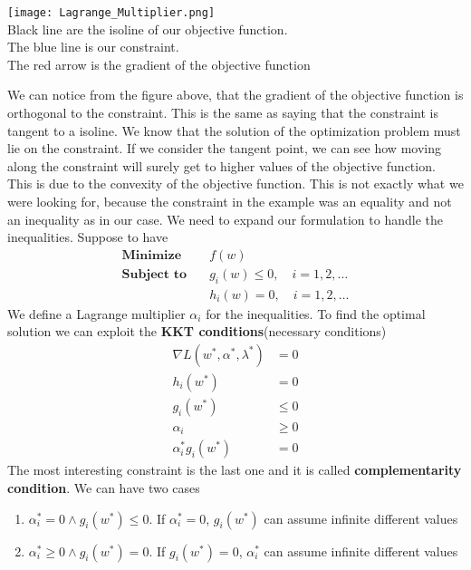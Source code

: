\documentclass[main.tex]{subfiles}
\begin{document}
\begin{center}
    \texttt{[image: Lagrange\_Multiplier.png]} \\
    Black line are the isoline of our objective function. \\
    The blue line is our constraint. \\
    The red arrow is the gradient of the objective function
\end{center}
We can notice from the figure above, that the gradient of the objective function is orthogonal to the constraint. This is the same as saying that the constraint is tangent to a isoline. We know that the solution of the optimization problem must lie on the constraint. If we consider the tangent point, we can see how moving along the constraint will surely get to higher values of the objective function. This is due to the convexity of the objective function.
\newline
This is not exactly what we were looking for, because the constraint in the example was an equality and not an inequality as in our case. We need to expand our formulation to handle the inequalities. Suppose to have
\begin{align*}
    \textbf{Minimize} \quad &f(w) \\
    \textbf{Subject to} \quad &g_i(w) \leq 0, \quad i=1,2,\dots \\
    &h_i(w) = 0, \quad i=1,2,\dots
\end{align*}
We define a Lagrange multiplier $\alpha_i$ for the inequalities. To find the optimal solution we can exploit the \textbf{KKT conditions}(necessary conditions)
\begin{align*}
    \nabla L(w^*,\alpha^*,\lambda^*) &= 0 \\
    h_i(w^*) &= 0 \\
    g_i(w^*) &\leq 0 \\
    \alpha_i &\geq 0 \\
    \alpha_i^* g_i(w^*) &= 0
\end{align*}
The most interesting constraint is the last one and it is called \textbf{complementarity condition}. We can have two cases
\begin{enumerate}
    \item $\alpha_i^* = 0 \land g_i(w^*) \leq 0$. If $\alpha_i^* = 0$, $g_i(w^*)$ can assume infinite different values
    \item $\alpha_i^* \geq 0 \land g_i(w^*) = 0$. If $g_i(w^*) = 0$, $\alpha_i^*$ can assume infinite different values
\end{enumerate}
\end{document}

